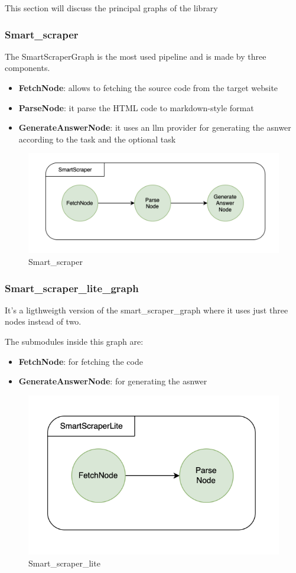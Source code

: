 This section will discuss the principal graphs of the library
\subsubsection{Smart\_scraper}
The SmartScraperGraph is the most used pipeline and is made by three components.
\begin{itemize}
    \item \textbf{FetchNode}: allows to fetching the source code from the target website
    \item \textbf{ParseNode}: it parse the HTML code to markdown-style format
    \item \textbf{GenerateAnswerNode}: it uses an llm provider for generating the asnwer according to the task and the optional task
\end{itemize}
\begin{figure}[H]
    \centering
    \includegraphics[width=0.75\linewidth]{Assets/smart_scraper.png}
    \caption{Smart\_scraper}
    \label{fig:smart_scraper}
\end{figure}

\subsubsection{Smart\_scraper\_lite\_graph}
It's a ligthweigth version of the smart\_scraper\_graph where it uses just three nodes instead of two.

The submodules inside this graph are:

\begin{itemize}
    \item \textbf{FetchNode}: for fetching the code
    \item \textbf{GenerateAnswerNode}: for generating the asnwer
\end{itemize}

\begin{figure}[H]
    \centering
    \includegraphics[width=0.5\linewidth]{Assets/smart_scraper_lite.png}
    \caption{Smart\_scraper\_lite}
    \label{fig:enter-label}
\end{figure}
